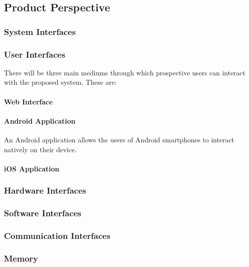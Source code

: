 \documentclass[10pt,a4paper]{article}
\begin{document}
		\subsection{Product Perspective}
		
			\subsubsection{System Interfaces}
			
			\subsubsection{User Interfaces}
		
				There will be three main mediums through which prospective users can interact with the proposed system. These are:
				
				\paragraph{Web Interface}
				
					
				
				\paragraph{Android Application}
				
					An Android application allows  the users of Android smartphones to interact natively on their device.
				
				\paragraph{iOS Application}
		
			\subsubsection{Hardware Interfaces}
			
			\subsubsection{Software Interfaces}
			
			\subsubsection{Communication Interfaces}
			
			\subsubsection{Memory}
			
\end{document}
